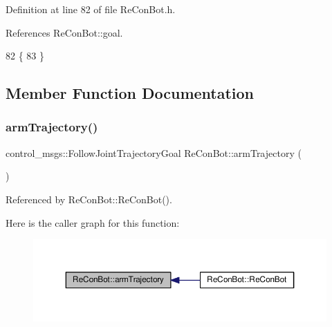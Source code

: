 Definition at line 82 of file Re\+Con\+Bot.\+h.



References Re\+Con\+Bot\+::goal.


\begin{DoxyCode}
82               \{
83   \}
\end{DoxyCode}


\subsection{Member Function Documentation}
\mbox{\label{class_re_con_bot_a950f2769ca61ff7b663d86ed2cf19c14}} 
\subsubsection{\texorpdfstring{arm\+Trajectory()}{armTrajectory()}}
{\footnotesize\ttfamily control\+\_\+msgs\+::\+Follow\+Joint\+Trajectory\+Goal Re\+Con\+Bot\+::arm\+Trajectory (\begin{DoxyParamCaption}{ }\end{DoxyParamCaption})\hspace{0.3cm}{\ttfamily [inherited]}}



Referenced by Re\+Con\+Bot\+::\+Re\+Con\+Bot().

Here is the caller graph for this function\+:
\nopagebreak
\begin{figure}[H]
\begin{center}
\leavevmode
\includegraphics[width=350pt]{d9/d0b/class_re_con_bot_a950f2769ca61ff7b663d86ed2cf19c14_icgraph}
\end{center}
\end{figure}
\mbox{\label{class_re_con_bot_a3d9656755c06ded1f3b88ce05565f758}} 
